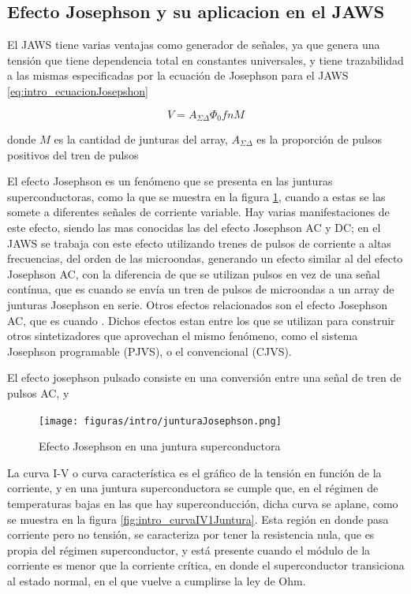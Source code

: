 \documentclass[twoside]{article}
\begin{document}
\begin{multicols}{2}
\subsection{Efecto Josephson y su aplicacion en el JAWS}

El JAWS tiene varias ventajas como generador de señales, ya que genera una tensión que tiene dependencia total en constantes universales, y tiene trazabilidad a las mismas especificadas por la ecuación de Josephson para el JAWS \ref{eq:intro_ecuacionJosepshon} \cite{behr2012}

\begin{equation}
    V = A_{\Sigma\Delta} \Phi_0 f n M
    \label{eq:intro_ecuacionJosephson}
\end{equation}

donde $M$ es la cantidad de junturas del array, $A_{\Sigma\Delta}$ es la proporción de pulsos positivos del tren de pulsos

El efecto Josephson es un fenómeno que se presenta en las junturas superconductoras, como la que se muestra en la figura \ref{fig:intro_junturaJosephson}, cuando a estas se las somete a diferentes señales de corriente variable. Hay varias manifestaciones de este efecto, siendo las mas conocidas las del efecto Josephson AC y DC; en el JAWS se trabaja con este efecto utilizando trenes de pulsos de corriente a altas frecuencias, del orden de las microondas, generando un efecto similar al del efecto Josephson AC, con la diferencia de que se utilizan pulsos en vez de una señal contínua, que es cuando se envía un tren de pulsos de microondas a un array de junturas Josephson en serie. Otros efectos relacionados son el efecto Josephson AC, que es cuando . Dichos efectos estan entre los que se utilizan para construir otros sintetizadores que aprovechan el mismo fenómeno, como el sistema Josephson programable (PJVS), o el convencional (CJVS). 

El efecto josephson pulsado consiste en una conversión entre una señal de tren de pulsos AC,  y 



\begin{figure}[H]
    \centering
    \texttt{[image: figuras/intro/junturaJosephson.png]}
    \caption{Efecto Josephson en una juntura superconductora}
    \label{fig:intro_junturaJosephson}
\end{figure}

La curva I-V o curva característica es el gráfico de la tensión en función de la corriente, y en una juntura superconductora se cumple que, en el régimen de temperaturas bajas en las que hay superconducción, dicha curva se aplane, como se muestra en la figura \ref{fig:intro_curvaIV1Juntura}. Esta región en donde pasa corriente  pero no tensión, se caracteriza por tener la resistencia nula, que es propia del régimen superconductor, y está presente cuando el módulo de la corriente es menor que la corriente crítica, en donde el superconductor transiciona al estado normal, en el que vuelve a cumplirse la ley de Ohm. 


\end{multicols}
\end{document}
